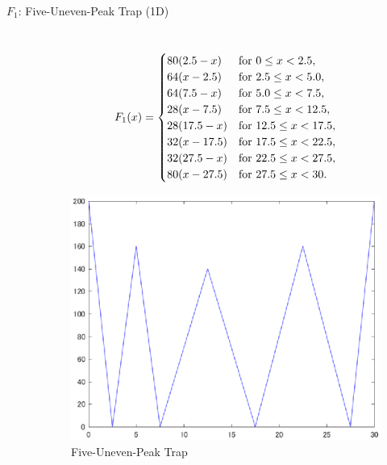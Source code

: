 \documentclass[a4j,11pt]{jarticle}
\begin{document}
\begin{description}
\item[$F_1$: Five-Uneven-Peak Trap (1D)]\mbox{}\\
\begin{equation}
\label{eq:f1}
F_1(x)=\begin{cases}
80(2.5-x) & {\rm for} \ 0 \leq x < 2.5, \\
64(x-2.5) & {\rm for} \ 2.5 \leq x < 5.0, \\
64(7.5-x) & {\rm for} \ 5.0 \leq x < 7.5, \\
28(x-7.5) & {\rm for} \ 7.5 \leq x < 12.5, \\
28(17.5-x) & {\rm for} \ 12.5 \leq x < 17.5, \\
32(x-17.5) & {\rm for} \ 17.5 \leq x < 22.5, \\
32(27.5-x) & {\rm for} \ 22.5 \leq x < 27.5, \\
80(x-27.5) & {\rm for} \ 27.5 \leq x < 30.
\end{cases}
\end{equation}
\begin{figure}[h]
\centering
\includegraphics[width=0.8\linewidth]{eps/F1.eps}
\caption{Five-Uneven-Peak Trap}
\label{fig:f1}
\end{figure}


\end{description}
\end{document}
